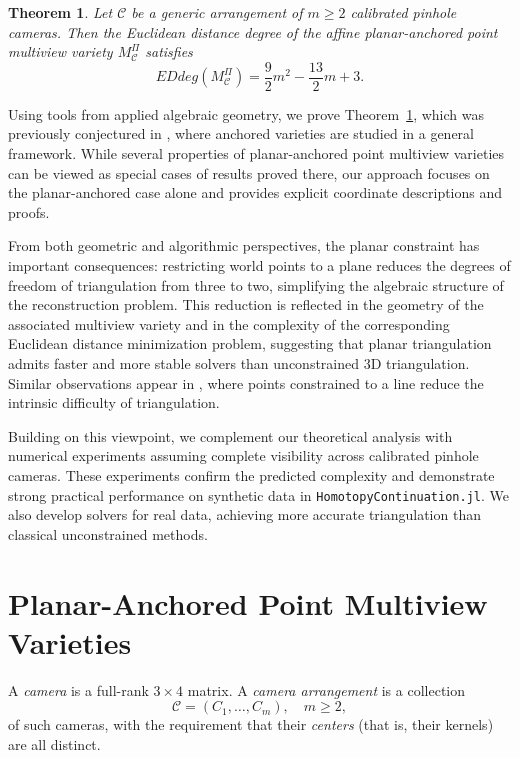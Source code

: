 \documentclass{article}
\newtheorem{theorem}{Theorem}
\begin{document}
\begin{theorem}\label{EDdeg_plane-thm}
Let \( \mathcal{C} \) be a generic arrangement of \( m\geq 2 \) calibrated pinhole cameras. Then the Euclidean
distance degree of the affine planar-anchored point multiview variety $M^\Pi_{\mathcal{C}}$ satisfies
\[
EDdeg(M^\Pi_{\mathcal{C}})
= \frac{9}{2}m^2 - \frac{13}{2}m + 3.
\]
\end{theorem}
Using tools from applied algebraic geometry, we prove Theorem~\ref{EDdeg_plane-thm}, which was previously conjectured in \cite{DuffRydell2024}, where anchored varieties are studied in a general framework. While several properties of planar-anchored point multiview varieties can be viewed as special cases of results proved there, our approach focuses on the planar-anchored case alone and provides explicit coordinate descriptions and proofs.

From both geometric and algorithmic perspectives, the planar constraint has important consequences: restricting world points to a plane reduces the degrees of freedom of triangulation from three to two, simplifying the algebraic structure of the reconstruction problem. This reduction is reflected in the geometry of the associated multiview variety and in the complexity of the corresponding Euclidean distance minimization problem, suggesting that planar triangulation admits faster and more stable solvers than unconstrained 3D triangulation. Similar observations appear in \cite{RST23}, where points constrained to a line reduce the intrinsic difficulty of triangulation.

Building on this viewpoint, we complement our theoretical analysis with numerical experiments assuming complete visibility across calibrated pinhole cameras. These experiments confirm the predicted complexity and demonstrate strong practical performance on synthetic data in \texttt{HomotopyContinuation.jl}. We also develop solvers for real data, achieving more accurate triangulation than classical unconstrained methods.

\section{Planar-Anchored Point Multiview Varieties}
A \emph{camera} is a full-rank $3 \times 4$ matrix. 
A \emph{camera arrangement} is a collection 
\[
\mathcal{C} = (C_1, \ldots, C_m), \quad m \geq 2,
\]
of such cameras, with the requirement that their \emph{centers} (that is, their kernels) are all distinct.  
\end{document}
